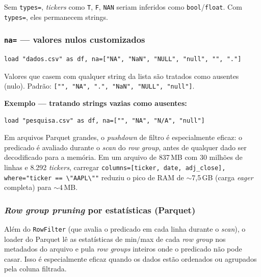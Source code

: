 Sem \texttt{types=}, \textit{tickers} como \texttt{T}, \texttt{F}, \texttt{NAN}
seriam inferidos como \texttt{bool}/\texttt{float}. Com \texttt{types=}, eles
permanecem strings.

\subsubsection*{\texttt{na=} --- valores nulos customizados}

\begin{lstlisting}[caption={Valores nulos customizados}]
load "dados.csv" as df, na=["NA", "NaN", "NULL", "null", "", "."]
\end{lstlisting}

Valores que casem com qualquer string da lista são tratados como ausentes (nulo).
Padrão: \texttt{["", "NA", ".", "NaN", "NULL", "null"]}.

\textbf{Exemplo --- tratando strings vazias como ausentes:}

\begin{lstlisting}[caption={Nulls customizados para dados de pesquisa}]
load "pesquisa.csv" as df, na=["", "NA", "N/A", "null"]
\end{lstlisting}

\begin{nota}
  Em arquivos Parquet grandes, o \textit{pushdown} de filtro é especialmente
  eficaz: o predicado é avaliado durante o \textit{scan} do \textit{row group},
  antes de qualquer dado ser decodificado para a memória. Em um arquivo de
  837\,MB com 30 milhões de linhas e 8.292 \textit{tickers}, carregar
  \texttt{columns=[ticker, date, adj\_close], where="ticker == \textbackslash"AAPL\textbackslash""}
  reduziu o pico de RAM de $\sim$7{,}5\,GB (carga \textit{eager} completa) para
  $\sim$4\,MB.
\end{nota}

\subsubsection*{\textit{Row group pruning} por estatísticas (Parquet)}

Além do \texttt{RowFilter} (que avalia o predicado em cada linha durante o
\textit{scan}), o loader do Parquet lê as estatísticas de min/max de cada
\textit{row group} nos metadados do arquivo e pula \textit{row groups} inteiros
onde o predicado não pode casar. Isso é especialmente eficaz quando os dados
estão ordenados ou agrupados pela coluna filtrada.

